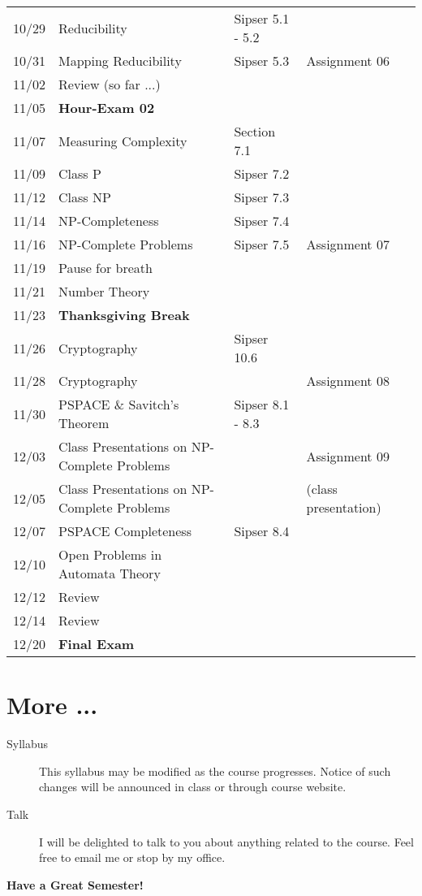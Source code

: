\documentclass[twoside]{article}
\begin{document}
\begin{longtable}{lllll}
10/29 & Reducibility & Sipser 5.1 - 5.2&\\%
10/31 & Mapping Reducibility& Sipser 5.3 &Assignment 06\\
11/02 & Review (so far ...)& &\\\midrule
11/05 & {\bf Hour-Exam 02}& & \\%
11/07 &Measuring Complexity & Section 7.1 &\\
11/09 & Class P& Sipser 7.2 & \\\midrule
11/12 & Class NP& Sipser 7.3&\\%
11/14 & NP-Completeness & Sipser  7.4& \\
11/16 & NP-Complete Problems & Sipser 7.5 &Assignment 07\\\midrule
11/19 & Pause for breath & &\\%
11/21 & Number Theory &  &  \\
11/23 & {\bf Thanksgiving Break} & &  \\\midrule
11/26 & Cryptography & Sipser 10.6&\\
11/28 & Cryptography & &Assignment 08\\
11/30 &PSPACE \& Savitch's Theorem &Sipser 8.1 - 8.3 &  \\\midrule
12/03 & Class Presentations on NP-Complete Problems& & Assignment 09\\%
12/05 & Class Presentations on NP-Complete Problems&& (class presentation) \\
12/07 & PSPACE Completeness & Sipser 8.4 &\\\midrule
12/10 & Open Problems in Automata Theory&&\\
12/12 & Review & & \\
12/14 & Review  & & \\\midrule
12/20 & {\bf Final Exam} & & \\\bottomrule
\end{longtable}

\section{More ...}
\begin{description}
\item[Syllabus] This syllabus may be modified as the course progresses. Notice of such changes will be announced in class or through course website.
\item [Talk] I will be delighted to talk to you about anything related to the course. Feel free to email me or stop by my office.
\end{description}
\centering\bf{Have a Great Semester!}
\end{document}
